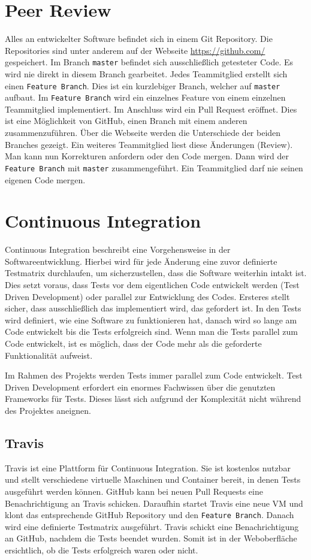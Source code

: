 \section{Peer Review}
Alles an entwickelter Software befindet sich in einem \gls{Git}
\gls{Repository}. Die Repositories sind unter anderem auf der Webseite
\url{https://github.com/} gespeichert. Im Branch \texttt{master} befindet sich
ausschließlich getesteter Code. Es wird nie direkt in diesem Branch gearbeitet.
Jedes Teammitglied erstellt sich einen \texttt{Feature Branch}. Dies ist ein
kurzlebiger Branch, welcher auf \texttt{master} aufbaut. Im \texttt{Feature
Branch} wird ein einzelnes Feature von einem einzelnen Teammitglied
implementiert. Im Anschluss wird ein Pull Request eröffnet. Dies ist eine
Möglichkeit von \gls{GitHub}, einen Branch mit einem anderen zusammenzuführen.
Über die Webseite werden die Unterschiede der beiden Branches gezeigt. Ein
weiteres Teammitglied liest diese Änderungen (Review). Man kann nun Korrekturen
anfordern oder den Code mergen. Dann wird der \texttt{Feature Branch} mit
\texttt{master} zusammengeführt. Ein Teammitglied darf nie seinen eigenen Code
mergen.
\tm%

\section{Continuous Integration}
Continuous Integration beschreibt eine Vorgehensweise in der
Softwareentwicklung. Hierbei wird für jede Änderung eine zuvor definierte
Testmatrix durchlaufen, um sicherzustellen, dass die Software weiterhin intakt
ist. Dies setzt voraus, dass Tests vor dem eigentlichen Code entwickelt werden
(Test Driven Development) oder parallel zur Entwicklung des Codes. Ersteres
stellt sicher, dass ausschließlich das implementiert wird, das gefordert ist.
In den Tests wird definiert, wie eine Software zu funktionieren hat, danach
wird so lange am Code entwickelt bis die Tests erfolgreich sind. Wenn man die
Tests parallel zum Code entwickelt, ist es möglich, dass der Code mehr als die
geforderte Funktionalität aufweist.

Im Rahmen des Projekts werden Tests immer parallel zum Code entwickelt. Test
Driven Development erfordert ein enormes Fachwissen über die genutzten
Frameworks für Tests. Dieses lässt sich aufgrund der Komplexität nicht während
des Projektes aneignen.
\tm%

\subsection{Travis}
Travis ist eine Plattform für Continuous Integration. Sie ist kostenlos nutzbar
und stellt verschiedene virtuelle Maschinen und Container bereit, in denen
Tests ausgeführt werden können. \gls{GitHub} kann bei neuen Pull Requests eine
Benachrichtigung an Travis schicken. Daraufhin startet Travis eine neue VM und
klont das entsprechende \gls{GitHub} \gls{Repository} und den \texttt{Feature
Branch}. Danach wird eine definierte Testmatrix ausgeführt. Travis schickt eine
Benachrichtigung an \gls{GitHub}, nachdem die Tests beendet wurden. Somit ist
in der Weboberfläche ersichtlich, ob die Tests erfolgreich waren oder nicht.

